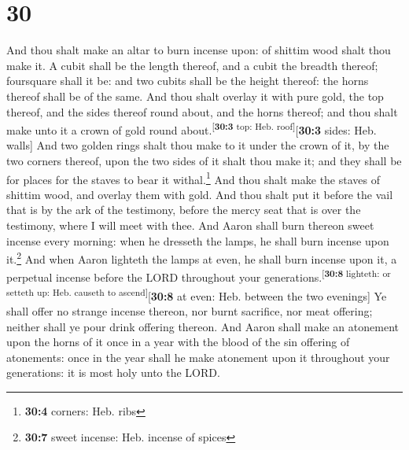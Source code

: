 \hypertarget{section-29}{%
\section{30}\label{section-29}}

 And thou shalt make an altar to burn incense upon: of
shittim wood shalt thou make it.  A cubit shall be the
length thereof, and a cubit the breadth thereof; foursquare shall it be:
and two cubits shall be the height thereof: the horns thereof shall be
of the same.  And thou shalt overlay it with pure gold,
the top thereof, and the sides thereof round about, and the horns
thereof; and thou shalt make unto it a crown of gold round
about.\textsuperscript{{[}\textbf{30:3} top: Heb.
roof{]}}{[}\textbf{30:3} sides: Heb. walls{]}  And two
golden rings shalt thou make to it under the crown of it, by the two
corners thereof, upon the two sides of it shalt thou make it; and they
shall be for places for the staves to bear it withal.\footnote{\textbf{30:4}
  corners: Heb. ribs}  And thou shalt make the staves of
shittim wood, and overlay them with gold.  And thou shalt
put it before the vail that is by the ark of the testimony, before the
mercy seat that is over the testimony, where I will meet with thee.
 And Aaron shall burn thereon sweet incense every morning:
when he dresseth the lamps, he shall burn incense upon it.\footnote{\textbf{30:7}
  sweet incense: Heb. incense of spices}  And when Aaron
lighteth the lamps at even, he shall burn incense upon it, a perpetual
incense before the LORD throughout your
generations.\textsuperscript{{[}\textbf{30:8} lighteth: or setteth up:
Heb. causeth to ascend{]}}{[}\textbf{30:8} at even: Heb. between the two
evenings{]}  Ye shall offer no strange incense thereon,
nor burnt sacrifice, nor meat offering; neither shall ye pour drink
offering thereon.  And Aaron shall make an atonement upon
the horns of it once in a year with the blood of the sin offering of
atonements: once in the year shall he make atonement upon it throughout
your generations: it is most holy unto the LORD.

